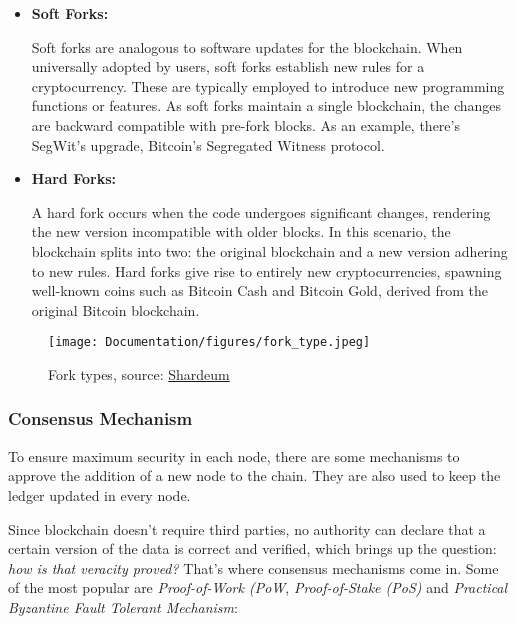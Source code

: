 \begin{itemize}
    \item \textbf{Soft Forks:}

    Soft forks are analogous to software updates for the blockchain.
When universally adopted by users, soft forks establish new rules for a cryptocurrency.
These are typically employed to introduce new programming functions or features.
As soft forks maintain a single blockchain, the changes are backward compatible with pre-fork blocks. As an example, there's SegWit's upgrade, Bitcoin's Segregated Witness protocol.\newline
    \item \textbf{Hard Forks:}

    A hard fork occurs when the code undergoes significant changes, rendering the new version incompatible with older blocks.
In this scenario, the blockchain splits into two: the original blockchain and a new version adhering to new rules.
Hard forks give rise to entirely new cryptocurrencies, spawning well-known coins such as Bitcoin Cash and Bitcoin Gold, derived from the original Bitcoin blockchain.

\end{itemize}

\begin{figure}[htbp]
	\centering
	\texttt{[image: Documentation/figures/fork\_type.jpeg]}  %
	\caption{Fork types, source: \href{https://shardeum.org/blog/what-is-a-blockchain-fork/}{Shardeum}}
	\label{fig:fork_type}
\end{figure}



\subsubsection{Consensus Mechanism} \label{cons.mec}

To ensure maximum security in each node, there are some mechanisms to approve the addition of a new node to the chain. They are also used to keep the ledger updated in every node. \par
Since blockchain doesn't require third parties, no authority can declare that a certain version of the data is correct and verified, which brings up the question: \textit{how is that veracity proved?} \newline
That's where consensus mechanisms come in. Some of the most popular are \textit{Proof-of-Work (PoW}, \textit{Proof-of-Stake (PoS)} and \textit{Practical Byzantine Fault Tolerant Mechanism}:\newline

